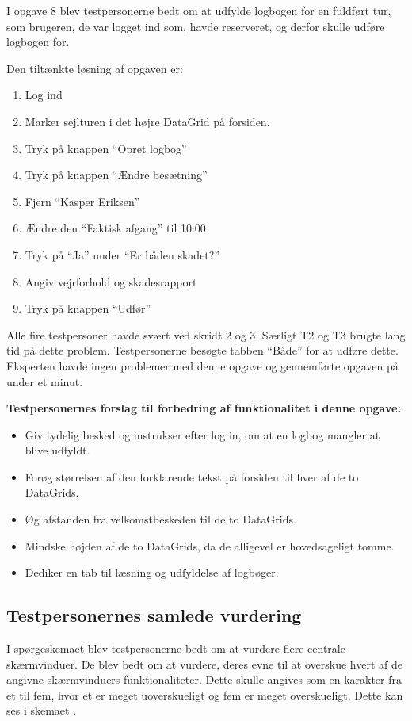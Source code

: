 I opgave 8 blev testpersonerne bedt om at udfylde logbogen for en fuldført tur, som brugeren, de var logget ind som, havde reserveret, og derfor skulle udføre logbogen for.

Den tiltænkte løsning af opgaven er:
\begin{enumerate}
    \item Log ind
    \item Marker sejlturen i det højre DataGrid på forsiden.
    \item Tryk på knappen ``Opret logbog''
    \item Tryk på knappen ``Ændre besætning''
    \item Fjern ``Kasper Eriksen''
    \item Ændre den ``Faktisk afgang'' til 10:00
    \item Tryk på ``Ja'' under ``Er båden skadet?''
    \item Angiv vejrforhold og skadesrapport
    \item Tryk på knappen ``Udfør''
\end{enumerate}

Alle fire testpersoner havde svært ved skridt 2 og 3.
Særligt T2 og T3 brugte lang tid på dette problem.
Testpersonerne besøgte tabben ``Både'' for at udføre dette. 
Eksperten havde ingen problemer med denne opgave og gennemførte opgaven på under et minut.

\textbf{Testpersonernes forslag til forbedring af funktionalitet i denne opgave:}
\begin{itemize}
    \item Giv tydelig besked og instrukser efter log in, om at en logbog mangler at blive udfyldt.
    \item Forøg størrelsen af den forklarende tekst på forsiden til hver af de to DataGrids.
    \item Øg afstanden fra velkomstbeskeden til de to DataGrids.
    \item Mindske højden af de to DataGrids, da de alligevel er hovedsageligt tomme. 
    \item Dediker en tab til læsning og udfyldelse af logbøger. 
\end{itemize}

\subsection{Testpersonernes samlede vurdering}

I spørgeskemaet blev testpersonerne bedt om at vurdere flere centrale skærmvinduer.
De blev bedt om at vurdere, deres evne til at overskue hvert af de angivne skærmvinduers funktionaliteter.
Dette skulle angives som en karakter fra et til fem, hvor et er meget uoverskueligt og fem er meget overskueligt.
Dette kan ses i skemaet .

